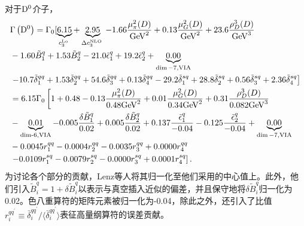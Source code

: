 对于$\mathrm{D^{0}}$介子，
\begin{equation}
    \begin{aligned}
    & \Gamma\left(\mathrm{D^0}\right)= \Gamma_0[\underbrace{6.15}_{c_3^{\text {Lo }}}+\underbrace{2.95}_{\Delta c_3^{\text {NLO }}}-1.66 \frac{\mu_\pi^2(D)}{\mathrm{GeV}^2}+0.13 \frac{\mu_G^2(D)}{\mathrm{GeV}^2}+23.6 \frac{\rho_D^3(D)}{\mathrm{GeV}^3} \\
    &-1.60 \tilde{B}_1^q+1.53 \tilde{B}_2^q-21.0 \tilde{\epsilon}_1^q+19.2 \tilde{\epsilon}_2^q+\underbrace{0.00}_{\operatorname{dim}-7, \mathrm{VIA}} \\
    &\left.-10.7 \tilde{\delta}_1^{q q}+1.53 \tilde{\delta}_2^{q q}+54.6 \tilde{\delta}_3^{q q}+0.13 \tilde{\delta}_4^{q q}-29.2 \tilde{\delta}_1^{s q}+28.8 \tilde{\delta}_2^{s q}+0.56 \tilde{\delta}_3^{s q}+2.36 \tilde{\delta}_4^{s q}\right] \\
    &= 6.15 \Gamma_0\left[1+0.48-0.13 \frac{\mu_\pi^2(D)}{0.48 \mathrm{GeV}^2}+0.01 \frac{\mu_G^2(D)}{0.34 \mathrm{GeV}^2}+0.31 \frac{\rho_D^3(D)}{0.082 \mathrm{GeV}^3}\right. \\
    &-\underbrace{0.01}_{\operatorname{dim-6,\mathrm {VIA}}}-0.005 \frac{\delta \tilde{B}_1^q}{0.02}+0.005 \frac{\delta \tilde{B}_2^q}{0.02}+0.137 \frac{\tilde{\epsilon}_1^q}{-0.04}-0.125 \frac{\tilde{\epsilon}_2^q}{-0.04}+\underbrace{0.00}_{\operatorname{dim}-7, \mathrm{VIA}} \\
    &-0.0045 r_1^{q q}-0.0004 r_2^{q q}-0.0035 r_3^{q q}+0.0000 r_4^{q q} \\
    &\left.-0.0109 r_1^{s q}-0.0079 r_2^{s q}-0.0000 r_3^{s q}+0.0001 r_4^{s q}\right] .
    \end{aligned}
    \label{eq:decaywidth_D0_kinetic}
    \end{equation}
    为讨论各个部分的贡献，Lenz等人将其归一化至他们采用的中心值上。此外，他们引入$\tilde{B}_i^q = 1 + \delta \tilde{B}_i^q$以表示与真空插入近似的偏差，并且保守地将$\delta \tilde{B}_i^q$归一化为0.02。色八重算符的矩阵元素被归一化为-0.04，除此之外，还引入了比值$r_i^{q q^{\prime}} \equiv \bar{\delta}_i^{q q^{\prime}}/\langle \bar{\delta}_i^{q q^{\prime}}\rangle$表征高量纲算符的误差贡献。
    

